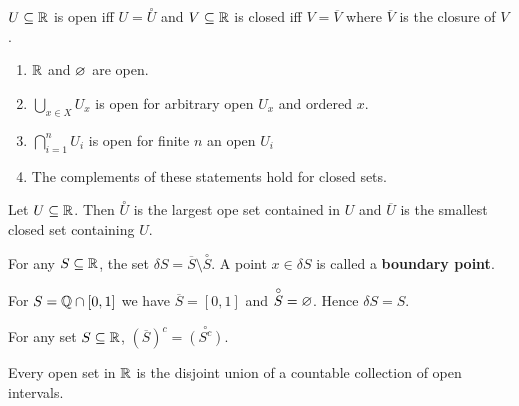 \begin{recall}
	\( U \subseteq \mathbb{R}\) is open iff \(U = \overset{\circ}{U} \) and \(V \subseteq \mathbb{R}\) is closed iff \(V = \overline{V}\) where \(\overline{V}\) is the closure of \(V\).
\end{recall}
\begin{proposition}
\begin{enumerate}
	\item \(\mathbb{R}\) and \(\varnothing\) are open.\\
		\item \(\bigcup_{x \in X} U_{x} \) is open for arbitrary open \(U_{x}\) and ordered \(x\).
			\item \(\bigcap_{i=1}^{n} U_{i} \) is open for finite \(n\) an open \(U_{i}\)
				\item The complements of these statements hold for closed sets.

\end{enumerate}
\end{proposition}
\begin{proposition}
	Let \(U\subseteq \mathbb{R}\). Then \(\overset{\circ}{U}\) is the largest ope set contained in \(U\) and \(\overline{U}\) is the smallest closed set containing \(U\).
\end{proposition}
\begin{definition}[Boundary]
	For any \(S \subseteq \mathbb{R}\), the set \(\delta S = \overline{S} \setminus \overset{\circ}{S}\). A point \(x \in\delta S \) is called a \textbf{boundary point}.
\end{definition}
\begin{example}
	For \(S = \mathbb{Q} \cap \left[ 0, 1 \right] \) we have \(\overline{S} = \left[ 0, 1 \right] \) and \(\overset{\circ}{S} = \varnothing\). Hence \(\delta S = S\).
\end{example}
\begin{lemma}
	For any set \(S \subseteq \mathbb{R}\), \(\left( \overline{S} \right) ^{c} = \overset{\circ}{\left( S^{c} \right) }\).
\end{lemma}
\begin{theorem}
	Every open set in \(\mathbb{R}\) is the disjoint union of a countable collection of open intervals.
\end{theorem}

